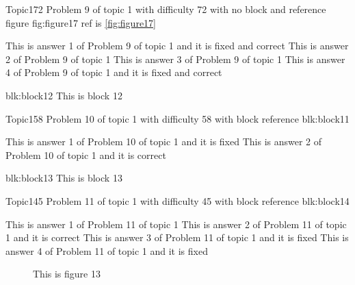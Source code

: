 \documentclass[master]{exam}
\begin{document}
\begin{problem}{Topic1}{72}
	Problem 9 of topic 1 with difficulty 72 with no block and reference figure fig:figure17 ref is \ref{fig:figure17}
	\begin{answers}
		 This is answer 1 of Problem 9 of topic 1 and it is fixed and correct
		\answer This is answer 2 of Problem 9 of topic 1 
		\answer This is answer 3 of Problem 9 of topic 1 
		 This is answer 4 of Problem 9 of topic 1 and it is fixed and correct
	\end{answers}
\end{problem}



\begin{block}{blk:block12}
This is block 12
\end{block}


\begin{problem}[requires=blk:block11]{Topic1}{58}
	Problem 10 of topic 1 with difficulty 58 with block reference blk:block11
	\begin{answers}
		\answer[fixed] This is answer 1 of Problem 10 of topic 1 and it is fixed
		\answer[correct] This is answer 2 of Problem 10 of topic 1 and it is correct
	\end{answers}
\end{problem}



\begin{block}{blk:block13}
This is block 13
\end{block}


\begin{problem}[requires=blk:block14]{Topic1}{45}
	Problem 11 of topic 1 with difficulty 45 with block reference blk:block14
	\begin{answers}
		\answer This is answer 1 of Problem 11 of topic 1 
		\answer[correct] This is answer 2 of Problem 11 of topic 1 and it is correct
		\answer[fixed] This is answer 3 of Problem 11 of topic 1 and it is fixed
		\answer[fixed] This is answer 4 of Problem 11 of topic 1 and it is fixed
	\end{answers}
\end{problem}



\begin{figure}
	\begin{center}
		This is figure 13 
		\label{fig:figure13}
	\end{center}
\end{figure}
\end{document}
